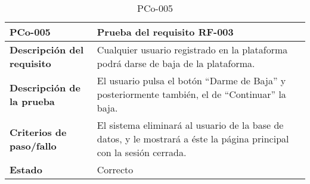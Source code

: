 \begin{table}[htpb]
\centering
\begin{tabularx}{\textwidth}{|l|X|}
\hline
\textbf{PCo-005}                     & \textbf{Prueba del requisito RF-003}                                                                                 \\ \hline
\textbf{Descripción del requisito} & Cualquier usuario registrado en la plataforma podrá darse de baja de la plataforma.                                  \\ \hline
\textbf{Descripción de la prueba}  & El usuario pulsa el botón ``Darme de Baja'' y posteriormente también, el de ``Continuar'' la baja.                      \\ \hline
\textbf{Criterios de paso/fallo}   & El sistema eliminará al usuario de la base de datos, y le mostrará a éste la página principal con la sesión cerrada. \\ \hline
\textbf{Estado}                    & Correcto                                                                                                             \\ \hline
\end{tabularx}
\caption{PCo-005}
\end{table}


